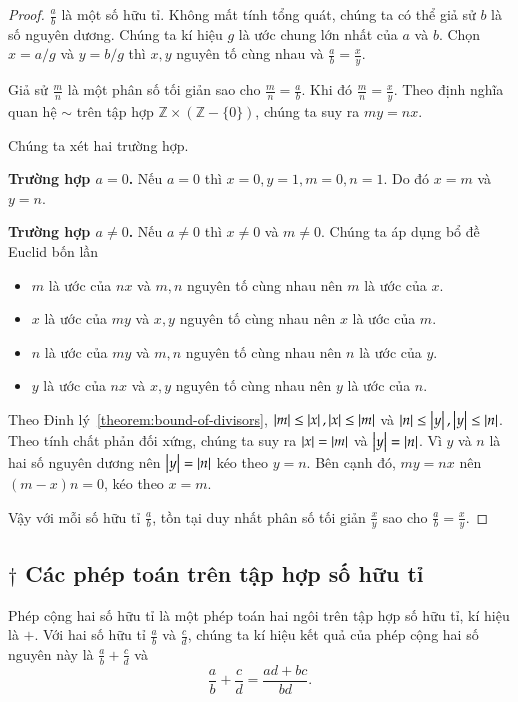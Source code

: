 \begin{proof}
	$\frac{a}{b}$ là một số hữu tỉ. Không mất tính tổng quát, chúng ta có thể giả sử $b$ là số nguyên dương. Chúng ta kí hiệu $g$ là ước chung lớn nhất của $a$ và $b$. Chọn $x = a/g$ và $y = b/g$ thì $x, y$ nguyên tố cùng nhau và $\frac{a}{b} = \frac{x}{y}$.

	Giả sử $\frac{m}{n}$ là một phân số tối giản sao cho $\frac{m}{n} = \frac{a}{b}$. Khi đó $\frac{m}{n} = \frac{x}{y}$. Theo định nghĩa quan hệ $\sim$ trên tập hợp $\mathbb{Z}\times (\mathbb{Z} - \{0\})$, chúng ta suy ra $m y = n x$.

	Chúng ta xét hai trường hợp.

	\textbf{Trường hợp $a = 0$.} Nếu $a = 0$ thì $x = 0, y = 1, m = 0, n = 1$. Do đó $x = m$ và $y = n$.

	\textbf{Trường hợp $a\ne 0$.} Nếu $a\ne 0$ thì $x\ne 0$ và $m\ne 0$. Chúng ta áp dụng bổ đề Euclid bốn lần
	\begin{itemize}
		\item $m$ là ước của $n x$ và $m, n$ nguyên tố cùng nhau nên $m$ là ước của $x$.
		\item $x$ là ước của $m y$ và $x, y$ nguyên tố cùng nhau nên $x$ là ước của $m$.
		\item $n$ là ước của $m y$ và $m, n$ nguyên tố cùng nhau nên $n$ là ước của $y$.
		\item $y$ là ước của $n x$ và $x, y$ nguyên tố cùng nhau nên $y$ là ước của $n$.
	\end{itemize}

	Theo Đinh lý~\ref{theorem:bound-of-divisors}, $\left\vert{m}\right\vert \leq \left\vert{x}\right\vert, \left\vert{x}\right\vert \leq \left\vert{m}\right\vert$ và $\left\vert{n}\right\vert \leq \left\vert{y}\right\vert, \left\vert{y}\right\vert \leq \left\vert{n}\right\vert$. Theo tính chất phản đối xứng, chúng ta suy ra $\left\vert{x}\right\vert = \left\vert{m}\right\vert$ và $\left\vert{y}\right\vert = \left\vert{n}\right\vert$. Vì $y$ và $n$ là hai số nguyên dương nên $\left\vert{y}\right\vert = \left\vert{n}\right\vert$ kéo theo $y = n$. Bên cạnh đó, $m y = n x$ nên $(m - x) n = 0$, kéo theo $x = m$.

	Vậy với mỗi số hữu tỉ $\frac{a}{b}$, tồn tại duy nhất phân số tối giản $\frac{x}{y}$ sao cho $\frac{a}{b} = \frac{x}{y}$.
\end{proof}

\subsection{$\dagger$ Các phép toán trên tập hợp số hữu tỉ}

\begin{definition}
	Phép cộng hai số hữu tỉ là một phép toán hai ngôi trên tập hợp số hữu tỉ, kí hiệu là $+$. Với hai số hữu tỉ $\frac{a}{b}$ và $\frac{c}{d}$, chúng ta kí hiệu kết quả của phép cộng hai số nguyên này là $\frac{a}{b} + \frac{c}{d}$ và
	\[
		\frac{a}{b} + \frac{c}{d} = \frac{a d + b c}{b d}.
	\]
\end{definition}


